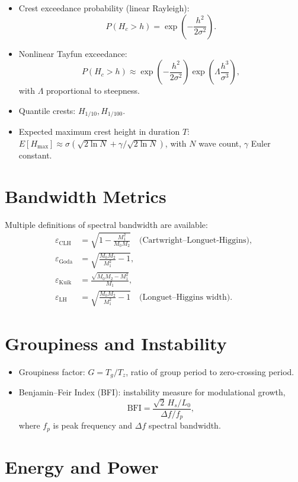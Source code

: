 \documentclass[11pt]{article}
\begin{document}
\begin{itemize}
  \item Crest exceedance probability (linear Rayleigh):
  \[
  P(H_c > h) = \exp\!\left(-\frac{h^2}{2\sigma^2}\right).
  \]
  \item Nonlinear Tayfun exceedance:
  \[
  P(H_c > h) \approx \exp\!\left(-\frac{h^2}{2\sigma^2}\right)\exp\!\left(\Lambda \frac{h^3}{\sigma^3}\right),
  \]
  with $\Lambda$ proportional to steepness.
  \item Quantile crests: $H_{1/10}, H_{1/100}$.
  \item Expected maximum crest height in duration $T$:  
  $E[H_{\max}] \approx \sigma(\sqrt{2\ln N} + \gamma/\sqrt{2\ln N})$, with $N$ wave count, $\gamma$ Euler constant.
\end{itemize}

\section{Bandwidth Metrics}

Multiple definitions of spectral bandwidth are available:
\begin{align}
\varepsilon_{\text{CLH}} &= \sqrt{1 - \tfrac{M_1^2}{M_0 M_2}} \quad \text{(Cartwright–Longuet-Higgins)}, \\
\varepsilon_{\text{Goda}} &= \sqrt{\tfrac{M_0 M_2}{M_1^2} - 1}, \\
\varepsilon_{\text{Kuik}} &= \frac{\sqrt{M_0 M_2 - M_1^2}}{M_1}, \\
\varepsilon_{\text{LH}} &= \sqrt{\tfrac{M_0 M_2}{M_1^2} - 1} \quad \text{(Longuet–Higgins width)}.
\end{align}

\section{Groupiness and Instability}

\begin{itemize}
  \item Groupiness factor: $G = T_g/T_z$, ratio of group period to zero-crossing period.
  \item Benjamin–Feir Index (BFI): instability measure for modulational growth,
  \[
  \text{BFI} = \frac{\sqrt{2}\,H_s/L_0}{\Delta f/f_p},
  \]
  where $f_p$ is peak frequency and $\Delta f$ spectral bandwidth.
\end{itemize}

\section{Energy and Power}
\end{document}
